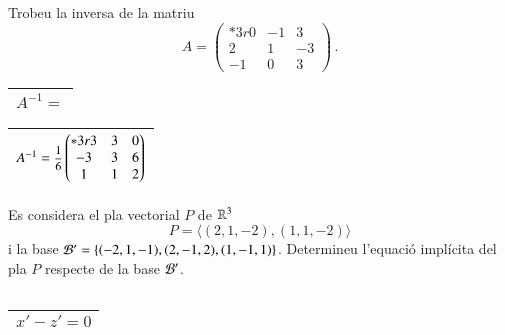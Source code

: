 \documentclass[11pt,catalan]{article}
\begin{document}
\begin{enunciat}
Trobeu la inversa de la matriu 
\[
  A = \begin{pmatrix}{*{3}r} 0 & -1 & 3\\ 2 & 1 & -3\\ -1 & 0 & 3\end{pmatrix}\,.
\]
\end{enunciat}

\begin{quadricula}
\begin{tabular}{|L{5cm}{1.25cm}|}
\hline
$A^{-1}=$ \\
\hline
\end{tabular}
\end{quadricula}

\begin{solucio}
\begin{center}
\begin{tabular}{|C{5cm}{1.25cm}|}
\hline
$A^{-1}=\deufrac{1}{6}\begin{pmatrix}{*{3}r} 3 & 3 & 0\\ -3 & 3 & 6\\ 1 & 1 & 2\end{pmatrix}$ \\
\hline
\end{tabular}
\end{center}
\end{solucio}


\begin{enunciat}
Es considera el pla vectorial $P$ de $\rn 3$
\[
  P = \langle (2,1,-2), (1,1,-2) \rangle
\]
i la base $\cal B'=\{(-2,1,-1),(2,-1,2),(1,-1,1)\}$. Determineu l'equació implícita del pla $P$ respecte de la base $\cal B'$.
\end{enunciat}

\begin{quadricula}
\begin{tabular}{|C{5cm}{0.5cm}|}
\hline
 \\
\hline
\end{tabular}
\end{quadricula}

\begin{solucio}
\begin{center}
\begin{tabular}{|C{5cm}{0.5cm}|}
\hline
$x' - z' = 0$ \\
\hline
\end{tabular}
\end{center}
\end{solucio}
\end{document}
